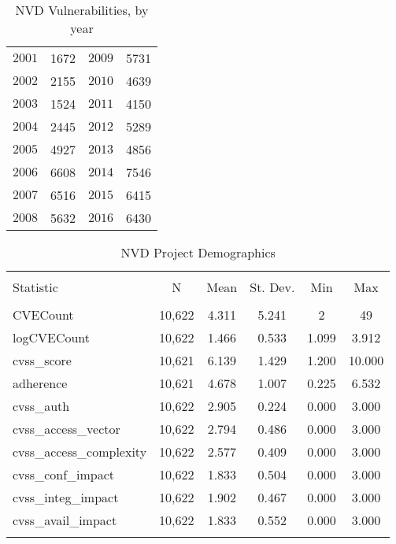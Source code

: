 \begin{table}
	\begin{center}	
		\caption{NVD Vulnerabilities, by year}
		\begin{large}	
			\begin{tabular}{l|l||l|l}
				$2001$ & 1672 & $2009$ & 5731\\
				$2002$ & 2155 & $2010$ & 4639\\
				$2003$ & 1524 & $2011$ & 4150\\
				$2004$ & 2445 & $2012$ & 5289\\
				$2005$ & 4927 & $2013$ & 4856\\
				$2006$ & 6608 & $2014$ & 7546\\
				$2007$ & 6516 & $2015$ & 6415\\
				$2008$ & 5632 & $2016$ & 6430\\
			\end{tabular}
			\label{tab:nvd_vulns_year}
		\end{large}
	\end{center}
\end{table}

\begin{table}[!htbp] \centering 
	\caption{NVD Project Demographics} 
	\label{tab:nvd_demog} 
	\begin{small}
	\begin{tabular}{@{\extracolsep{5pt}}lccccc} 
		\\[-1.8ex]\hline 
		\hline \\[-1.8ex] 
		Statistic & \multicolumn{1}{c}{N} & \multicolumn{1}{c}{Mean} & \multicolumn{1}{c}{St. Dev.} & \multicolumn{1}{c}{Min} & \multicolumn{1}{c}{Max} \\ 
		\hline \\[-1.8ex] 
		CVECount & 10,622 & 4.311 & 5.241 & 2 & 49 \\ 
		logCVECount & 10,622 & 1.466 & 0.533 & 1.099 & 3.912 \\ 
		cvss\_score & 10,621 & 6.139 & 1.429 & 1.200 & 10.000 \\ 
		adherence & 10,621 & 4.678 & 1.007 & 0.225 & 6.532 \\ 
		cvss\_auth & 10,622 & 2.905 & 0.224 & 0.000 & 3.000 \\ 
		cvss\_access\_vector & 10,622 & 2.794 & 0.486 & 0.000 & 3.000 \\ 
		cvss\_access\_complexity & 10,622 & 2.577 & 0.409 & 0.000 & 3.000 \\ 
		cvss\_conf\_impact & 10,622 & 1.833 & 0.504 & 0.000 & 3.000 \\ 
		cvss\_integ\_impact & 10,622 & 1.902 & 0.467 & 0.000 & 3.000 \\ 
		cvss\_avail\_impact & 10,622 & 1.833 & 0.552 & 0.000 & 3.000 \\ 
		\hline \\[-1.8ex] 
	\end{tabular} 
		\end{small}
	
\end{table} 

